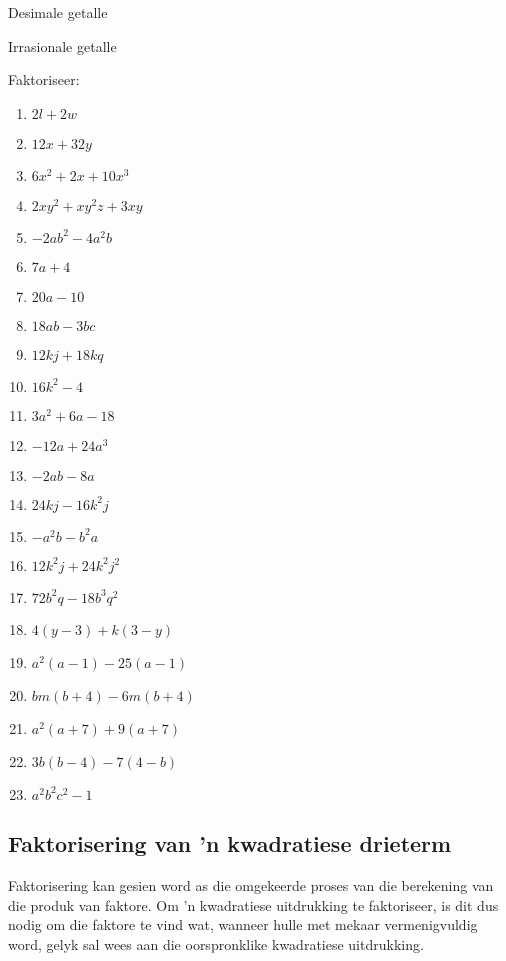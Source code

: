 \begin{Aktiwiteit}{Desimale getalle}
\begin{aktiwiteit}{Irrasionale getalle}
\begin{exercises}{}
{
Faktoriseer:
\begin{multicols}{2}
\begin{enumerate}[itemsep=5pt, label=\textbf{\arabic*}. ] 
\item $2l+2w$
\item $12x+32y$
\item $6{x}^{2}+2x+10{x}^{3}$
\item $2x{y}^{2}+x{y}^{2}z+3xy$
\item $-2a{b}^{2}-4{a}^{2}b$
\item $7a+4$ 
\item $20a-10$ 
\item $18ab-3bc$
\item $12kj+18kq$ 
\item $16{k}^{2}-4$ 
\item $3{a}^{2}+6a-18$
\item $-12a+24a^3$ 
\item $-2ab-8a$ 
\item $24kj-16{k}^{2}j$
\item $-{a}^{2}b-{b}^{2}a$ 
\item $12{k}^{2}j+24{k}^{2}{j}^{2}$ 
\item $72{b}^{2}q-18{b}^{3}{q}^{2}$
\item $4(y-3)+k(3-y)$ 
\item $a^2(a-1)-25(a-1)$ 
\item $bm(b+4)-6m(b+4)$
\item ${a}^{2}(a+7)+9(a+7)$ 
\item $3b(b-4)-7(4-b)$ 
\item ${a}^{2}{b}^{2}{c}^{2}-1$
\end{enumerate}
\end{multicols}

}
\end{exercises}



\subsection* {Faktorisering van 'n kwadratiese drieterm}

    
Faktorisering kan gesien word as die omgekeerde proses van die berekening van die produk van faktore. Om
’n kwadratiese uitdrukking te faktoriseer, is dit dus nodig om die faktore te vind wat, wanneer hulle met mekaar
vermenigvuldig word, gelyk sal wees aan die oorspronklike kwadratiese uitdrukking.\par 


\end{aktiwiteit}
\end{Aktiwiteit}
